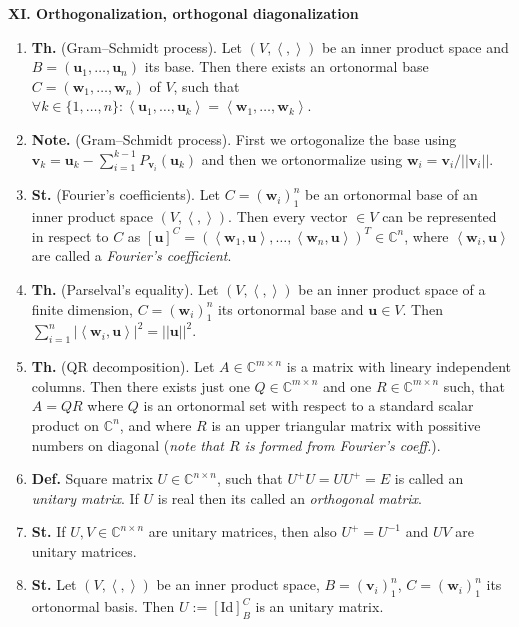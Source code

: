 \documentclass{article}
\newcommand{\<}{\left<}
\renewcommand{\>}{\right>}
\newcommand{\Id}{\text{Id}}
\newcommand*\norm[1]{||#1||}
\newcommand{\C}{\mathbb{C}}
\newcommand{\define}{\textbf{Def. }}
\newcommand{\state}{\textbf{St. }}
\newcommand{\theor}{\textbf{Th. }}
\newcommand{\note}{\textbf{Note. }}
\begin{document}
\begin{multicols}{3}
\begin{enumerate}[itemsep=2pt, topsep=2pt, partopsep=2pt, parsep=2pt]
    \end{enumerate}

    \textbf{XI. Orthogonalization, orthogonal diagonalization}

    \begin{enumerate}[itemsep=2pt, topsep=2pt, partopsep=2pt, parsep=2pt]

        \item \theor (Gram–Schmidt process). Let $(V,\<,\>)$ be an inner product space and $B=(\bm u_1,\ldots,\bm u_n)$ its base. Then there exists an ortonormal base $C=(\bm w_1,\ldots,\bm w_n)$ of $V$, such that $\forall k\in\{1,\ldots,n\}:\<\bm u_1,\ldots,\bm u_k\>=\<\bm w_1,\ldots,\bm w_k\>$.
        \item \note (Gram–Schmidt process). First we ortogonalize the base using $\bm v_k=\bm u_k-\sum_{i=1}^{k-1}P_{\bm v_i}(\bm u_k)$ and then we ortonormalize using $\bm w_i=\bm v_i/\norm{\bm v_i}$.
        \item \state (Fourier's coefficients). Let $C=(\bm w_i)_1^n$ be an ortonormal base of an inner product space $(V,\<,\>)$. Then every vector $\bm\in V$ can be represented in respect to $C$ as $[\bm u]^C=\left(\<\bm w_1,\bm u\>,\ldots,\<\bm w_n,\bm u\>\right)^T\in\C^n$, where $\<\bm w_i,\bm u\>$ are called a \emph{Fourier's coefficient}.
        \item \theor (Parselval's equality). Let $(V,\<,\>)$ be an inner product space of a finite dimension, $C=(\bm w_i)_1^n$ its ortonormal base and $\bm u\in V$. Then $\sum_{i=1}^n|\<\bm w_i,\bm u\>|^2=\norm{\bm u}^2$.
        \item \theor (QR decomposition). Let $A\in\C^{m\times n}$ is a matrix with lineary independent columns. Then there exists just one $Q\in\C^{m\times n}$ and one $R\in\C^{m\times n}$ such, that $A=QR$ where $Q$ is an ortonormal set with respect to a standard scalar product on $\C^n$, and where $R$ is an upper triangular matrix with possitive numbers on diagonal (\emph{note that $R$ is formed from Fourier's coeff.}).
        \item \define Square matrix $U\in\C^{n\times n}$, such that $U^+U=UU^+=E$ is called an \emph{unitary matrix}. If $U$ is real then its called an \emph{orthogonal matrix}.
        \item \state If $U,V\in\C^{n\times n}$ are unitary matrices, then also $U^+=U^{-1}$ and $UV$ are unitary matrices.
        \item \state Let $(V,\<,\>)$ be an inner product space, $B=(\bm v_i)_1^n$, $C=(\bm w_i)_1^n$ its ortonormal basis. Then $U:=[\Id]_B^C$ is an unitary matrix.

\end{enumerate}
\end{multicols}
\end{document}
